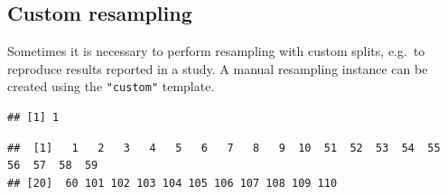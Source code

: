 \documentclass[
]{scrbook}
\newenvironment{Shaded}{\begin{snugshade}}{\end{snugshade}}
\newcommand{\AttributeTok}[1]{\textcolor[rgb]{0.77,0.63,0.00}{#1}}
\newcommand{\DecValTok}[1]{\textcolor[rgb]{0.00,0.00,0.81}{#1}}
\newcommand{\FunctionTok}[1]{\textcolor[rgb]{0.00,0.00,0.00}{#1}}
\newcommand{\NormalTok}[1]{#1}
\newcommand{\OtherTok}[1]{\textcolor[rgb]{0.56,0.35,0.01}{#1}}
\newcommand{\SpecialCharTok}[1]{\textcolor[rgb]{0.00,0.00,0.00}{#1}}
\newcommand{\StringTok}[1]{\textcolor[rgb]{0.31,0.60,0.02}{#1}}
\renewenvironment{Shaded} {\begin{snugshade}\small} {\end{snugshade}}
\begin{document}
\hypertarget{resamp-custom}{%
\subsection{Custom resampling}\label{resamp-custom}}

Sometimes it is necessary to perform resampling with custom splits, e.g.~to reproduce results reported in a study.
A manual resampling instance can be created using the \texttt{"custom"} template.

\begin{Shaded}
\end{Shaded}

\begin{verbatim}
## [1] 1
\end{verbatim}

\begin{Shaded}
\end{Shaded}

\begin{verbatim}
##  [1]   1   2   3   4   5   6   7   8   9  10  51  52  53  54  55  56  57  58  59
## [20]  60 101 102 103 104 105 106 107 108 109 110
\end{verbatim}

\begin{Shaded}
\end{Shaded}
\end{document}
